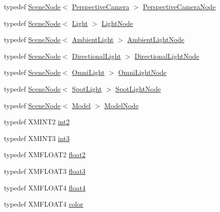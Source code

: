 \begin{DoxyCompactItemize}
\item 
typedef \hyperlink{classmage_1_1_scene_node}{Scene\+Node}$<$ \hyperlink{classmage_1_1_perspective_camera}{Perspective\+Camera} $>$ \hyperlink{namespacemage_a4542f24699be53c2f30040ce575155a7}{Perspective\+Camera\+Node}
\item 
typedef \hyperlink{classmage_1_1_scene_node}{Scene\+Node}$<$ \hyperlink{classmage_1_1_light}{Light} $>$ \hyperlink{namespacemage_a7516e49e86864dbb1196ceed9a11ac6a}{Light\+Node}
\item 
typedef \hyperlink{classmage_1_1_scene_node}{Scene\+Node}$<$ \hyperlink{classmage_1_1_ambient_light}{Ambient\+Light} $>$ \hyperlink{namespacemage_a282fb14928fdd9bf45e8f3fdd2dc6c5d}{Ambient\+Light\+Node}
\item 
typedef \hyperlink{classmage_1_1_scene_node}{Scene\+Node}$<$ \hyperlink{classmage_1_1_directional_light}{Directional\+Light} $>$ \hyperlink{namespacemage_a5e5cbd16a5bf7ca2b7cdf1b0a37b79b4}{Directional\+Light\+Node}
\item 
typedef \hyperlink{classmage_1_1_scene_node}{Scene\+Node}$<$ \hyperlink{classmage_1_1_omni_light}{Omni\+Light} $>$ \hyperlink{namespacemage_a5d71843ded3749108547eba2a5ce4d85}{Omni\+Light\+Node}
\item 
typedef \hyperlink{classmage_1_1_scene_node}{Scene\+Node}$<$ \hyperlink{classmage_1_1_spot_light}{Spot\+Light} $>$ \hyperlink{namespacemage_ab9f49a82dd438032bb38c5436a657335}{Spot\+Light\+Node}
\item 
typedef \hyperlink{classmage_1_1_scene_node}{Scene\+Node}$<$ \hyperlink{classmage_1_1_model}{Model} $>$ \hyperlink{namespacemage_a3086b6de2ec7ebd59d8b0bdc57195760}{Model\+Node}
\item 
typedef X\+M\+I\+N\+T2 \hyperlink{namespacemage_aa22600b49377872988582e782d7b1fcd}{int2}
\item 
typedef X\+M\+I\+N\+T3 \hyperlink{namespacemage_a80c7f9de83dfbbd55bbf339dbcbd99cc}{int3}
\item 
typedef X\+M\+F\+L\+O\+A\+T2 \hyperlink{namespacemage_a536f5856288c280080c9cdf739e85ddc}{float2}
\item 
typedef X\+M\+F\+L\+O\+A\+T3 \hyperlink{namespacemage_aab5dae4b0aaf8129b9e0d651d91d4b38}{float3}
\item 
typedef X\+M\+F\+L\+O\+A\+T4 \hyperlink{namespacemage_aa79484ea5211c29727b3794199ac0a55}{float4}
\item 
typedef X\+M\+F\+L\+O\+A\+T4 \hyperlink{namespacemage_a56eceea5a9bceb2b56073f3ea4945781}{color}
\end{DoxyCompactItemize}
